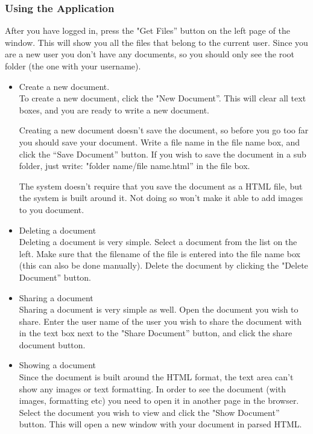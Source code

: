 \documentclass[11pt]{article}
\begin{document}
\subsubsection{Using the Application}
\label{sec-3-4-2}

After you have logged in, press the "Get Files'' button on the left page of the window. 
This will show you all the files that belong to the current user. Since you are a new user you don't have any documents, so you should only see the root folder (the one with your username).
\begin{itemize}

\item Create a new document.\\
\label{sec-3-4-2-1}%
To create a new document, click the "New Document''. This will clear all text boxes, and you are ready to write a new document.

Creating a new document doesn't save the document, so before you go too far you should save your document.
Write a file name in the file name box, and click the ``Save Document'' button.
If you wish to save the document in a sub folder, just write: "folder name/file name.html'' in the file box.

The system doesn't require that you save the document as a HTML file, but the system is built around it. Not doing so won't make it able to add images to you document.

\item Deleting a document\\
\label{sec-3-4-2-2}%
Deleting a document is very simple.
Select a document from the list on the left. Make sure that the filename of the file is entered into the file name box (this can also be done manually). Delete the document by clicking the "Delete Document'' button.

\item Sharing a document\\
\label{sec-3-4-2-3}%
Sharing a document is very simple as well.
Open the document you wish to share. Enter the user name of the user you wish to share the document with in the text box next to the "Share Document'' button, and click the share document button.

\item Showing a document\\
\label{sec-3-4-2-4}%
Since the document is built around the HTML format, the text area can't show any images or text formatting.
In order to see the document (with images, formatting etc) you need to open it in another page in the browser.
Select the document you wish to view and click the "Show Document'' button. This will open a new window with your document in parsed HTML.

\end{itemize} %
\end{document}

